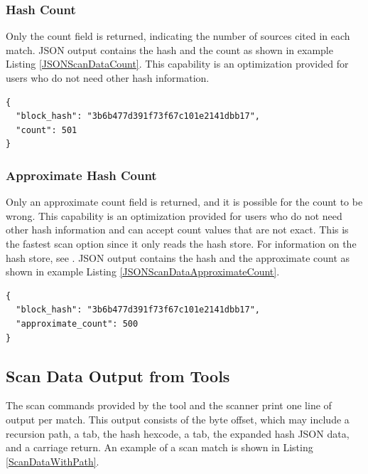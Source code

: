 \documentclass[11pt,fleqn]{article} %
\begin{document}
\subsubsection{Hash Count}
Only the count field is returned, indicating the number of sources cited in each match. JSON output contains the hash and the count as shown in example Listing \ref{JSONScanDataCount}. This capability is an optimization provided for users who do not need other hash information.

\lstset{style=customfile}
\begin{lstlisting}[float, caption={Example JSON block hash data count output from a scan match, with line breaks added for readability}, label=JSONScanDataCount]
{
  "block_hash": "3b6b477d391f73f67c101e2141dbb17",
  "count": 501
}
\end{lstlisting}

\subsubsection{Approximate Hash Count}
Only an approximate count field is returned, and it is possible for the count to be wrong. This capability is an optimization provided for users who do not need other hash information and can accept count values that are not exact. This is the fastest scan option since it only reads the hash store. For information on the hash store, see \textbf{}. JSON output contains the hash and the approximate count as shown in example Listing \ref{JSONScanDataApproximateCount}. 

\lstset{style=customfile}
\begin{lstlisting}[float, caption={Example JSON block hash data approximate count output from a scan match, with line breaks added for readability}, label=JSONScanDataApproximateCount]
{
  "block_hash": "3b6b477d391f73f67c101e2141dbb17",
  "approximate_count": 500
}
\end{lstlisting}

\subsection{Scan Data Output from Tools}
The scan commands provided by the \hdb tool and the \bulk \hdb scanner print one line of output per match. This output consists of the byte offset, which may include a recursion path, a tab, the hash hexcode, a tab, the expanded hash JSON data, and a carriage return. An example of a scan match is shown in Listing \ref{ScanDataWithPath}.\\
\end{document}
